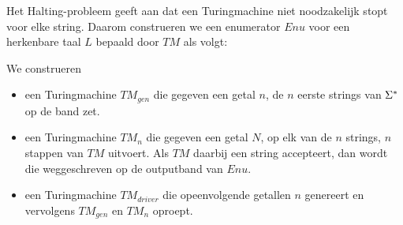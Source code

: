   Het Halting-probleem geeft aan dat een Turingmachine niet noodzakelijk stopt voor elke string. Daarom construeren we een enumerator $Enu$ voor een herkenbare taal $L$ bepaald door $TM$ als volgt:
 
  We construeren
  \begin{itemize}
  \item een Turingmachine $TM_{gen}$ die gegeven een getal $n$, de $n$ eerste strings van $\Sigma^*$ op de band zet.
  \item een Turingmachine $TM_n$ die gegeven een getal $N$, op elk van de $n$ strings, $n$ stappen van $TM$ uitvoert. Als $TM$ daarbij een string accepteert, dan wordt die weggeschreven op de outputband van $Enu$.
  \item een Turingmachine $TM_{driver}$ die opeenvolgende getallen $n$ genereert en vervolgens $TM_{gen}$ en $TM_n$ oproept.
  \end{itemize}